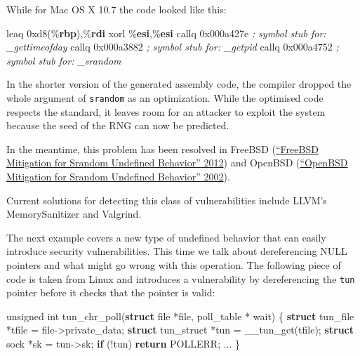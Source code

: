 \documentclass[
  a4paper,
]{report}
\newenvironment{Shaded}{}{}
\newcommand{\BaseNTok}[1]{\textcolor[rgb]{0.25,0.63,0.44}{#1}}
\newcommand{\CommentTok}[1]{\textcolor[rgb]{0.38,0.63,0.69}{\textit{#1}}}
\newcommand{\ControlFlowTok}[1]{\textcolor[rgb]{0.00,0.44,0.13}{\textbf{#1}}}
\newcommand{\DataTypeTok}[1]{\textcolor[rgb]{0.56,0.13,0.00}{#1}}
\newcommand{\KeywordTok}[1]{\textcolor[rgb]{0.00,0.44,0.13}{\textbf{#1}}}
\newcommand{\NormalTok}[1]{#1}
\newcommand{\OperatorTok}[1]{\textcolor[rgb]{0.40,0.40,0.40}{#1}}
\begin{document}
While for Mac OS X 10.7 the code looked like this:

\begin{Shaded}
\begin{Highlighting}[]
\NormalTok{leaq    }\BaseNTok{0xd8}\OperatorTok{(\%}\KeywordTok{rbp}\OperatorTok{),\%}\KeywordTok{rdi}
\NormalTok{xorl    }\OperatorTok{\%}\KeywordTok{esi}\OperatorTok{,\%}\KeywordTok{esi}
\NormalTok{callq   }\BaseNTok{0x000a427e}      \CommentTok{; symbol stub for: \_gettimeofday}
\NormalTok{callq   }\BaseNTok{0x000a3882}      \CommentTok{; symbol stub for: \_getpid}
\NormalTok{callq   }\BaseNTok{0x000a4752}      \CommentTok{; symbol stub for: \_srandom}
\end{Highlighting}
\end{Shaded}

In the shorter version of the generated assembly code, the compiler
dropped the whole argument of \texttt{srandom} as an optimization. While
the optimised code respects the standard, it leaves room for an attacker
to exploit the system because the seed of the RNG can now be predicted.

In the meantime, this problem has been resolved in FreeBSD
(\protect\hyperlink{ref-FbsdJunk}{{``FreeBSD Mitigation for Srandom
Undefined Behavior''} 2012}) and OpenBSD
(\protect\hyperlink{ref-ObsdJunk}{{``OpenBSD Mitigation for Srandom
Undefined Behavior''} 2002}).

Current solutions for detecting this class of vulnerabilities include
LLVM's MemorySanitizer and Valgrind.

The next example covers a new type of undefined behavior that can easily
introduce security vulnerabilities. This time we talk about
dereferencing NULL pointers and what might go wrong with this operation.
The following piece of code is taken from Linux and introduces a
vulnerability by dereferencing the \texttt{tun} pointer before it checks
that the pointer is valid:

\begin{Shaded}
\begin{Highlighting}[]
\DataTypeTok{unsigned} \DataTypeTok{int}
\NormalTok{tun\_chr\_poll}\OperatorTok{(}\KeywordTok{struct}\NormalTok{ file }\OperatorTok{*}\NormalTok{file}\OperatorTok{,}\NormalTok{ poll\_table }\OperatorTok{*}\NormalTok{ wait}\OperatorTok{)}
\OperatorTok{\{}
  \KeywordTok{struct}\NormalTok{ tun\_file }\OperatorTok{*}\NormalTok{tfile }\OperatorTok{=}\NormalTok{ file}\OperatorTok{{-}\textgreater{}}\NormalTok{private\_data}\OperatorTok{;}
  \KeywordTok{struct}\NormalTok{ tun\_struct }\OperatorTok{*}\NormalTok{tun }\OperatorTok{=}\NormalTok{ \_\_tun\_get}\OperatorTok{(}\NormalTok{tfile}\OperatorTok{);}
  \KeywordTok{struct}\NormalTok{ sock }\OperatorTok{*}\NormalTok{sk }\OperatorTok{=}\NormalTok{ tun}\OperatorTok{{-}\textgreater{}}\NormalTok{sk}\OperatorTok{;}
  \ControlFlowTok{if} \OperatorTok{(!}\NormalTok{tun}\OperatorTok{)}
    \ControlFlowTok{return}\NormalTok{ POLLERR}\OperatorTok{;}
  \OperatorTok{...}
\OperatorTok{\}}
\end{Highlighting}
\end{Shaded}
\end{document}
